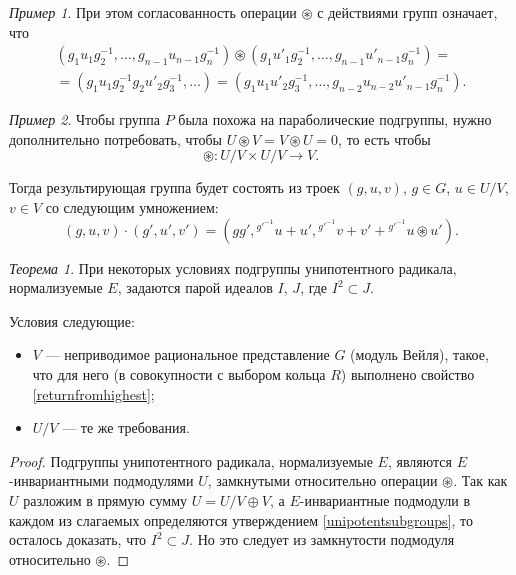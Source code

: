\documentclass[10pt]{article}
\theoremstyle{break}
\theoremstyle{remark}
\newtheorem{thm}{Теорема}
\newtheorem{example}{Пример}
\begin{document}
\begin{example}
При этом согласованность операции $\circledast$ с действиями групп означает, что
\begin{multline*}
(g_1 u_1 g_2^{-1}, \ldots, g_{n-1} u_{n-1} g_n^{-1}) \circledast (g_1 u'_1 g_2^{-1}, \ldots, g_{n-1} u'_{n-1} g_n^{-1}) 
= \\ =
(g_1 u_1 g_2^{-1} g_2 u'_2 g_3^{-1}, \ldots) = 
(g_1 u_1 u'_2 {g}_3^{-1}, \ldots, g_{n-2} u_{n-2} u'_{n-1} g_n^{-1}).
\end{multline*}
\end{example}

\begin{tcolorbox}[colback=white]
\begin{example}
Чтобы группа $P$ была похожа на параболические подгруппы, нужно дополнительно потребовать, чтобы $U \circledast V = V \circledast U = 0$, то есть чтобы
$$ \circledast : U/V \times U/V \to V.$$

Тогда результирующая группа будет состоять из троек $(g,u,v)$, $g \in G$, $u \in U/V$, $v \in V$ со следующим умножением:
$$
(g,u,v)\cdot (g',u',v') = (g g', {}^{g'^{-1}} u + u', {}^{g'^{-1}} v + v' + {}^{g'^{-1}} u \circledast u').
$$
\end{example}
\end{tcolorbox}

\begin{tcolorbox}[colback=white]
\begin{thm}
При некоторых условиях подгруппы унипотентного радикала, нормализуемые $E$, задаются парой идеалов $I$, $J$, где $I^2 \subset J$.

Условия следующие:
\begin{itemize}
\item $V$ --- неприводимое рациональное представление $G$ (модуль Вейля), такое, что для него (в совокупности с выбором кольца $R$) выполнено свойство \ref{returnfromhighest};
\item $U/V$ --- те же требования.
\end{itemize}
\end{thm}
\begin{proof}
Подгруппы унипотентного радикала, нормализуемые $E$, являются $E$-инвариантными подмодулями $U$, замкнутыми относительно операции $\circledast$. Так как $U$ разложим в прямую сумму $U = U/V \oplus V$, а $E$-инвариантные подмодули в каждом из слагаемых определяются утверждением \ref{unipotentsubgroups}, то осталось доказать, что $I^2 \subset J$. Но это следует из замкнутости подмодуля относительно $\circledast$.
\end{proof}
\end{tcolorbox}




\end{document}
